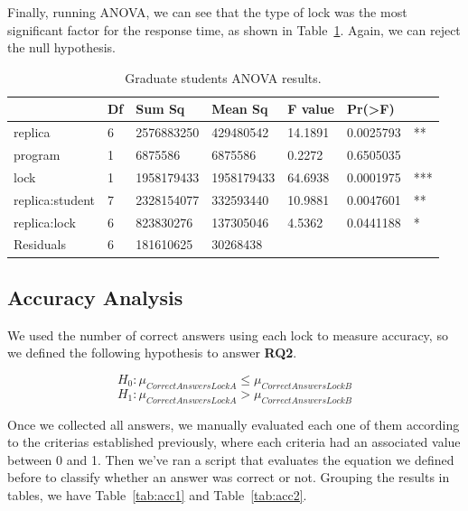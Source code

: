 Finally, running ANOVA, we can see that the type of lock was the most significant factor for the response time, as shown in Table~\ref{tab:anova2}. Again, we can reject the null hypothesis.

\begin{table}
\begin{center}
\caption{Graduate students ANOVA results.}\label{tab:anova2}
\begin{tabular}{|l|l|l|l|l|ll|}
\hline
                 & Df &    Sum Sq &   Mean Sq  & F value &   Pr(>F) & \\   
\hline
replica          & 6 & 2576883250 &  429480542 & 14.1891 & 0.0025793 & **  \\
program          & 1 &    6875586 &    6875586 &  0.2272 & 0.6505035 &     \\
lock             & 1 & 1958179433 & 1958179433 & 64.6938 & 0.0001975 & *** \\
replica:student  & 7 & 2328154077 &  332593440 & 10.9881 & 0.0047601 & **  \\
replica:lock     & 6 &  823830276 &  137305046 &  4.5362 & 0.0441188 & *   \\
Residuals        & 6 &  181610625 &   30268438 &         &           &     \\
\hline
\end{tabular}
\end{center}
\end{table}

\subsection{Accuracy Analysis}

We used the number of correct answers using each lock to measure accuracy, so we defined the following hypothesis to answer {\bf RQ2}. 

\begin{equation}
  H_{0} : \mu_{CorrectAnswersLockA} \leq \mu_{CorrectAnswersLockB}
\end{equation}
\begin{equation}
  H_{1} : \mu_{CorrectAnswersLockA} > \mu_{CorrectAnswersLockB}
\end{equation}

Once we collected all answers, we manually evaluated each one of them according to the criterias established previously, where each criteria had an associated value between 0 and 1. Then we've ran a script that evaluates the equation we defined before to classify whether an answer was correct or not. Grouping the results in tables, we have Table~\ref{tab:acc1} and Table~\ref{tab:acc2}.

